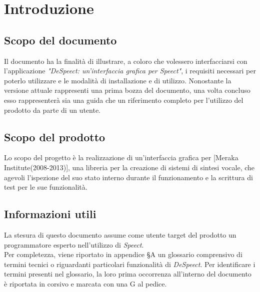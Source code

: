 \documentclass[openany,12pt,a4paper]{report}
\begin{document}
	\tableofcontents
	
	
	\chapter{Introduzione}
	
	\section{Scopo del documento}
	
	Il documento ha la finalità di illustrare, a coloro che volessero interfacciarsi con l’applicazione
	\textit{"DeSpeect: un'interfaccia grafica per Speect"}, i requisiti necessari per poterlo utilizzare e le modalità di installazione e di utilizzo. 
	Nonostante la versione attuale rappresenti una prima bozza del documento, una volta concluso esso rappresenterà sia una guida che un riferimento completo per l’utilizzo del prodotto da parte di un utente.
	
	\section{Scopo del prodotto}
	
	Lo scopo del progetto è la realizzazione di un’interfaccia grafica per  [Meraka Institute(2008-2013)], una libreria per la creazione di sistemi di sintesi vocale, che agevoli l’ispezione del suo stato interno durante il funzionamento e la scrittura di test per le sue funzionalità.
	
	\section{Informazioni utili}
	
	La stesura di questo documento assume come utente target del prodotto un programmatore esperto nell'utilizzo di \textit{Speect}. \\
	\noindent Per completezza, viene riportato in appendice §A un glossario comprensivo di termini tecnici o riguardanti particolari funzionalità di \textit{DeSpeect}. Per identificare i termini presenti nel glossario, la loro prima occorrenza all’interno del documento è riportata in corsivo e marcata con una G al pedice. 
	

\end{document}
